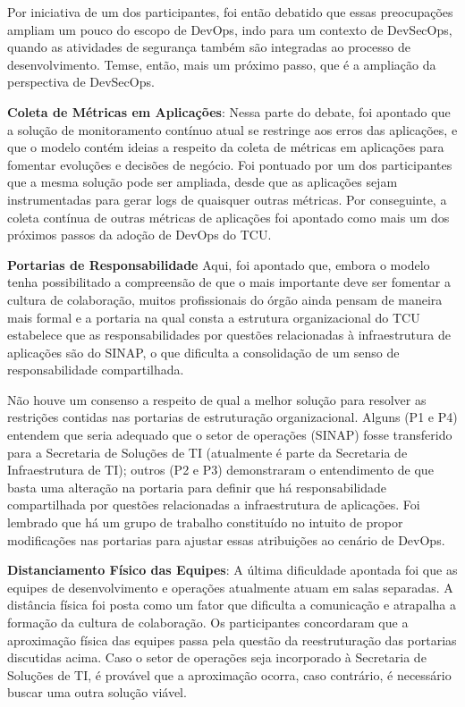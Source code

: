 {Por iniciativa de um dos participantes, foi então debatido que essas preocupações
ampliam um pouco do escopo de DevOps, indo para um contexto de DevSecOps, quando
as atividades de segurança também são integradas ao processo de desenvolvimento. Temse,
então, mais um próximo passo, que é a ampliação da perspectiva de DevSecOps.

\textbf{Coleta de Métricas em Aplicações}:
Nessa parte do debate, foi apontado que a solução de monitoramento contínuo atual se
restringe aos erros das aplicações, e que o modelo contém ideias a respeito da coleta de
métricas em aplicações para fomentar evoluções e decisões de negócio. Foi pontuado por
um dos participantes que a mesma solução pode ser ampliada, desde que as aplicações
sejam instrumentadas para gerar logs de quaisquer outras métricas. Por conseguinte, a
coleta contínua de outras métricas de aplicações foi apontado como mais um dos próximos
passos da adoção de DevOps do TCU.

\textbf{Portarias de Responsabilidade}
Aqui, foi apontado que, embora o modelo tenha possibilitado a compreensão de que o
mais importante deve ser fomentar a cultura de colaboração, muitos profissionais do
órgão ainda pensam de maneira mais formal e a portaria na qual consta a estrutura
organizacional do TCU estabelece que as responsabilidades por questões relacionadas à
infraestrutura de aplicações são do SINAP, o que dificulta a consolidação de um senso de
responsabilidade compartilhada.

Não houve um consenso a respeito de qual a melhor solução para resolver as restrições
contidas nas portarias de estruturação organizacional. Alguns (P1 e P4) entendem que
seria adequado que o setor de operações (SINAP) fosse transferido para a Secretaria de
Soluções de TI (atualmente é parte da Secretaria de Infraestrutura de TI); outros (P2 e P3)
demonstraram o entendimento de que basta uma alteração na portaria para definir que há
responsabilidade compartilhada por questões relacionadas a infraestrutura de aplicações.
Foi lembrado que há um grupo de trabalho constituído no intuito de propor modificações
nas portarias para ajustar essas atribuições ao cenário de DevOps.

\textbf{Distanciamento Físico das Equipes}:
A última dificuldade apontada foi que as equipes de desenvolvimento e operações atualmente
atuam em salas separadas. A distância física foi posta como um fator que dificulta
a comunicação e atrapalha a formação da cultura de colaboração. Os participantes concordaram
que a aproximação física das equipes passa pela questão da reestruturação das
portarias discutidas acima. Caso o setor de operações seja incorporado à Secretaria de
Soluções de TI, é provável que a aproximação ocorra, caso contrário, é necessário buscar
uma outra solução viável.

}

